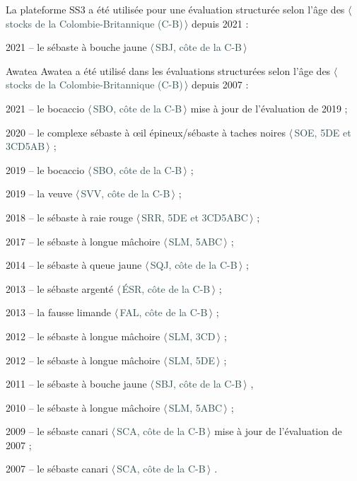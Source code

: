 \documentclass[11pt]{book}
\newcommand{\stock}[1]{$\langle$\,\textcolor{darkslategrey}{#1}\,$\rangle$}
\begin{document}
La plateforme SS3 a \'{e}t\'{e} utilis\'{e}e pour une \'{e}valuation structur\'{e}e selon l'\^{a}ge des \stock{stocks de la Colombie-Britannique (C-B)} depuis 2021 :
\begin{itemize_csas}{}{}
  \item 2021 -- le s\'{e}baste \`{a} bouche jaune \stock{SBJ, c\^{o}te de la C-B} \citep{Starr-Haigh:2022_ymr}
\end{itemize_csas}

Awatea Awatea a \'{e}t\'{e} utilis\'{e} dans les \'{e}valuations structur\'{e}es selon l'\^{a}ge des \stock{stocks de la Colombie-Britannique (C-B)} depuis 2007 :
\begin{itemize_csas}{}{}
  \item 2021 -- le bocaccio \stock{SBO, c\^{o}te de la C-B} mise \`{a} jour de l'\'{e}valuation de 2019 \citep{DFO-SR:2022_bor};
  \item 2020 -- le complexe s\'{e}baste \`{a} {\oe}il \'{e}pineux/s\'{e}baste \`{a} taches noires \stock{SOE, 5DE et 3CD5AB} \citep{Starr-Haigh:2022_rebs};
  \item 2019 -- le bocaccio \stock{SBO, c\^{o}te de la C-B} \citep{Starr-Haigh:2022_bor};
  \item 2019 -- la veuve \stock{SVV, c\^{o}te de la C-B} \citep{Starr-Haigh:2021_wwr};
  \item 2018 -- le s\'{e}baste \`{a} raie rouge \stock{SRR, 5DE et 3CD5ABC} \citep{Starr-Haigh:2021_rsr};
  \item 2017 -- le s\'{e}baste \`{a} longue m\^{a}choire \stock{SLM, 5ABC} \citep{Haigh-etal:2018_pop5ABC};
  \item 2014 -- le s\'{e}baste \`{a} queue jaune \stock{SQJ, c\^{o}te de la C-B} \citep{DFO-SAR:2015_ytr};
  \item 2013 -- le s\'{e}baste argent\'{e} \stock{\'{E}SR, c\^{o}te de la C-B} \citep{Starr-etal:2016_sgr};
  \item 2013 -- la fausse limande \stock{FAL, c\^{o}te de la C-B} \citep{Holt-etal:2016_rol};
  \item 2012 -- le s\'{e}baste \`{a} longue m\^{a}choire \stock{SLM, 3CD} \citep{Edwards-etal:2014_pop3CD};
  \item 2012 -- le s\'{e}baste \`{a} longue m\^{a}choire \stock{SLM, 5DE} \citep{Edwards-etal:2014_pop5DE};
  \item 2011 -- le s\'{e}baste \`{a} bouche jaune \stock{SBJ, c\^{o}te de la C-B} \citep{Edwards-etal:2012_ymr},
  \item 2010 -- le s\'{e}baste \`{a} longue m\^{a}choire \stock{SLM, 5ABC} \citep{Edwards-etal:2012_pop5ABC};
  \item 2009 -- le s\'{e}baste canari \stock{SCA, c\^{o}te de la C-B} mise \`{a} jour de l'\'{e}valuation de 2007 \citep{DFO-SR:2009_car};
  \item 2007 -- le s\'{e}baste canari \stock{SCA, c\^{o}te de la C-B} \citep{Stanley-etal:2009_car}.
\end{itemize_csas}
\end{document}
